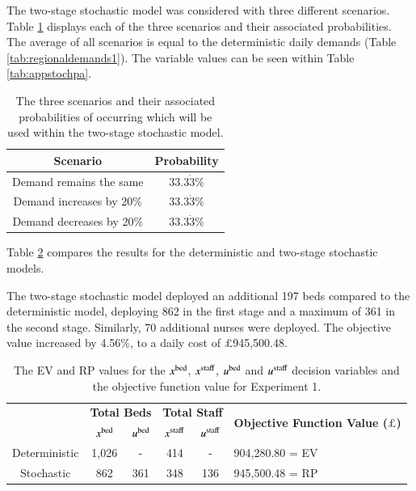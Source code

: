 \documentclass[../thesis.tex]{subfiles}
\begin{document}
The two-stage stochastic model was considered with three different scenarios. Table \ref{tab:scenarios1} displays each of the three scenarios and their associated probabilities. The average of all scenarios is equal to the deterministic daily demands (Table \ref{tab:regionaldemands1}). The variable values can be seen within Table \ref{tab:appstochpa}. 

\begin{table}[h!]
    \centering
    \begin{tabular}{@{}cc@{}}\toprule
       \textbf{Scenario}  &\textbf{Probability}  \\\midrule
       Demand remains the same & 33.3$\dot{3}$\% \\ 
       Demand increases by 20\% & 33.3$\dot{3}$\% \\
       Demand decreases by 20\% & 33.3$\dot{3}$\% \\\bottomrule
    \end{tabular}
    \caption{The three scenarios and their associated probabilities of occurring which will be used within the two-stage stochastic model.}
    \label{tab:scenarios1}
\end{table}


Table \ref{tab:dettwostageresults1} compares the results for the deterministic and two-stage stochastic models. 

The two-stage stochastic model deployed an additional 197 beds compared to the deterministic model, deploying 862 in the first stage and a maximum of 361 in the second stage. Similarly, 70 additional nurses were deployed. The objective value increased by 4.56\%, to a daily cost of $\pounds$945,500.48.

\begin{table}[h!]
    \centering
    \begin{tabular}{cccccl}\toprule
 & \multicolumn{2}{l}{\textbf{Total Beds}} & \multicolumn{2}{c}{\textbf{Total Staff}} & \multirow{2}{*}{\textbf{Objective Function Value ($\pounds$)}}\\ \cmidrule(lr){2-3} \cmidrule(lr){4-5}
 & $x^\textnormal{bed}$           & $u^\textnormal{bed}$          & $x^\textnormal{staff}$         & $u^\textnormal{staff}$         \\ \midrule
      Deterministic & 1,026 & - &  414 & - & 904,280.80 =  EV \\ \midrule
      Stochastic &862  & 361&348& 136& 945,500.48 = RP\\ \bottomrule
    \end{tabular}
    \caption{The EV and RP values for the $x^\textnormal{bed}$, $x^\textnormal{staff}$, $u^\textnormal{bed}$ and $u^\textnormal{staff}$ decision variables and the objective function value for Experiment 1.}
    \label{tab:dettwostageresults1}
\end{table}
\end{document}
